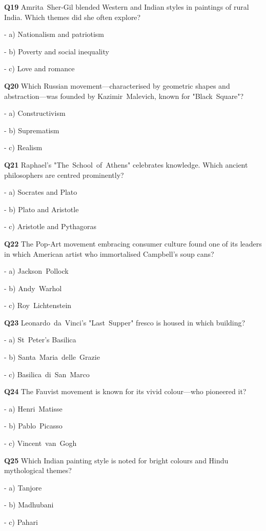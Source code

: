 \textbf{Q19} Amrita Sher‑Gil blended Western and Indian styles in paintings of rural India. Which themes did she often explore?\par
\quad - a) Nationalism and patriotism\par
\quad - b) Poverty and social inequality\par
\quad - c) Love and romance\par

\textbf{Q20} Which Russian movement—characterised by geometric shapes and abstraction—was founded by Kazimir Malevich, known for "Black Square"?\par
\quad - a) Constructivism\par
\quad - b) Suprematism\par
\quad - c) Realism\par

\textbf{Q21} Raphael's "The School of Athens" celebrates knowledge. Which ancient philosophers are centred prominently?\par
\quad - a) Socrates and Plato\par
\quad - b) Plato and Aristotle\par
\quad - c) Aristotle and Pythagoras\par

\textbf{Q22} The Pop‑Art movement embracing consumer culture found one of its leaders in which American artist who immortalised Campbell's soup cans?\par
\quad - a) Jackson Pollock\par
\quad - b) Andy Warhol\par
\quad - c) Roy Lichtenstein\par

\textbf{Q23} Leonardo da Vinci's "Last Supper" fresco is housed in which building?\par
\quad - a) St Peter's Basilica\par
\quad - b) Santa Maria delle Grazie\par
\quad - c) Basilica di San Marco\par

\textbf{Q24} The Fauvist movement is known for its vivid colour—who pioneered it?\par
\quad - a) Henri Matisse\par
\quad - b) Pablo Picasso\par
\quad - c) Vincent van Gogh\par

\textbf{Q25} Which Indian painting style is noted for bright colours and Hindu mythological themes?\par
\quad - a) Tanjore\par
\quad - b) Madhubani\par
\quad - c) Pahari\par

